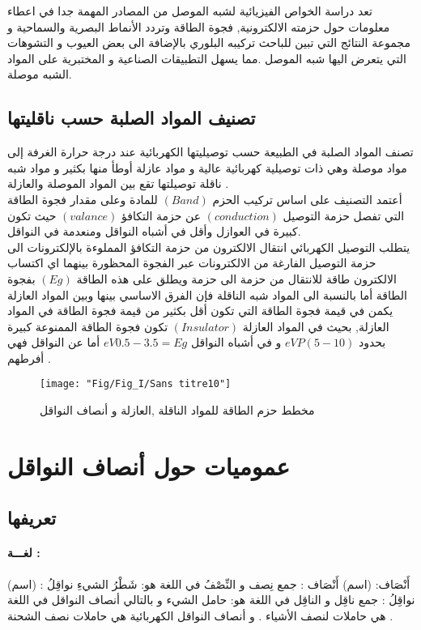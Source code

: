 تعد دراسة الخواص الفيزيائية لشبه الموصل من المصادر المهمة جدا في اعطاء معلومات حول حزمته الالكترونية, فجوة الطاقة وتردد الأنماط البصرية والسماحية و مجموعة النتائج التي تبين للباحث  تركيبه البلوري بالإضافة الى بعض العيوب و التشوهات التي يتعرض اليها شبه الموصل .مما يسهل التطبيقات الصناعية و المختبرية على المواد الشبه موصلة.

\subsection{تصنيف المواد الصلبة حسب ناقليتها }
تصنف المواد الصلبة في الطبيعة حسب توصيليتها الكهربائية عند
درجة حرارة الغرفة إلى مواد موصلة وهي ذات توصيلية كهربائية عالية و مواد عازلة أوطأ منها بكثير و مواد شبه ناقلة توصيلتها تقع بين المواد الموصلة والعازلة .\\
أعتمد التصنيف على اساس تركيب الحزم $ ( Band ) $ للمادة وعلى مقدار فجوة الطاقة التي تفصل حزمة التوصيل $ (conduction) $ عن حزمة التكافؤ $ (valance) $ حيث تكون كبيرة في العوازل وأقل في أشباه النواقل ومنعدمة في النواقل.\\
يتطلب التوصيل الكهربائي انتقال الالكترون من حزمة التكافؤ المملوءة بالإلكترونات الى حزمة التوصيل الفارغة من الالكترونات عبر الفجوة المحظورة بينهما اي اكتساب الالكترون طاقة للانتقال من حزمة الى حزمة ويطلق على هذه الطاقة $ (Eg) $ بفجوة الطاقة أما بالنسبة الى المواد شبه الناقلة فإن الفرق الاساسي بينها وبين المواد العازلة يكمن في قيمة فجوة الطاقة التي تكون أقل بكثير من قيمة فجوة الطاقة في المواد العازلة, بحيث  في المواد العازلة $ (  Insulator ) $ تكون فجوة الطاقة الممنوعة كبيرة بحدود $ eVP (5-10)  $ و في أشباه النواقل $ eV 0.5-3.5  = E{g} $ أما عن النواقل فهي أفرطهم .
\begin{figure}[h]
	\centering
	\texttt{[image: "Fig/Fig\_I/Sans titre10"]}
	\caption{مخطط حزم الطاقة للمواد الناقلة ,العازلة و أنصاف النواقل }
	\label{fig:sans-titre10}
\end{figure}
\FloatBarrier

\section{عموميات حول أنصاف النواقل}
\subsection{تعريفها }
\paragraph{لغـــة :}
أَنْصَاف: (اسم)
أَنْصَاف : جمع نِصف و النِّصْفُ في اللغة هو: شَطْرُ الشيءِ 
نواقِلُ : (اسم)
نواقِلُ : جمع ناقِل و الناقِل في اللغة هو: حامل الشيء
و بالتالي أنصاف النواقل في اللغة هي حاملات لنصف الأشياء .
و أنصاف النواقل الكهربائية هي حاملات نصف الشحنة . \cite{a1}

